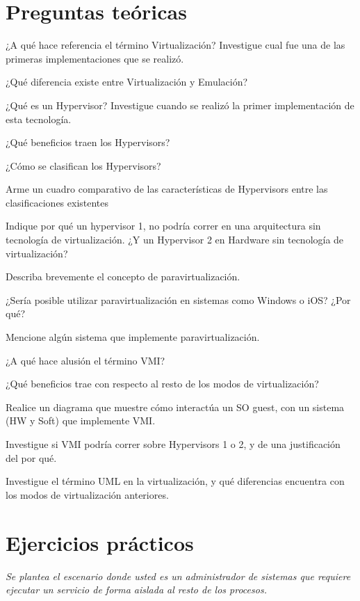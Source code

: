 \section{Preguntas teóricas}

\begin{questions}
\question ¿A qué hace referencia el término Virtualización? Investigue cual
fue una de las primeras implementaciones que se realizó.

\question ¿Qué diferencia existe entre Virtualización y Emulación?

\question ¿Qué es un Hypervisor? Investigue cuando se realizó la primer
implementación de esta tecnología.

\question ¿Qué beneficios traen los Hypervisors?

\question ¿Cómo se clasifican los Hypervisors? 

\question Arme un cuadro comparativo de las características de Hypervisors
entre las clasificaciones existentes

\question Indique por qué un hypervisor 1, no podría correr en una
arquitectura sin tecnología de virtualización. ¿Y un Hypervisor 2 en
Hardware sin tecnología de virtualización?

\question Describa brevemente el concepto de paravirtualización.

\question ¿Sería posible utilizar paravirtualización en sistemas como
Windows o iOS? ¿Por qué?

\question Mencione algún sistema que implemente paravirtualización.

\question ¿A qué hace alusión el término VMI?

\question ¿Qué beneficios trae con respecto al resto de los modos de
virtualización?

\question Realice un diagrama que muestre cómo interactúa un SO guest, con
un sistema (HW y Soft) que implemente VMI.

\question Investigue si VMI podría correr sobre Hypervisors 1 o 2, y de una
justificación del por qué.

\question Investigue el término UML en la virtualización, y qué diferencias
encuentra con los modos de virtualización anteriores.

\end{questions}

\section{Ejercicios prácticos}
\textit{Se plantea el escenario donde usted es un administrador de sistemas
  que requiere ejecutar un servicio de forma aislada al resto de los
  procesos.}

